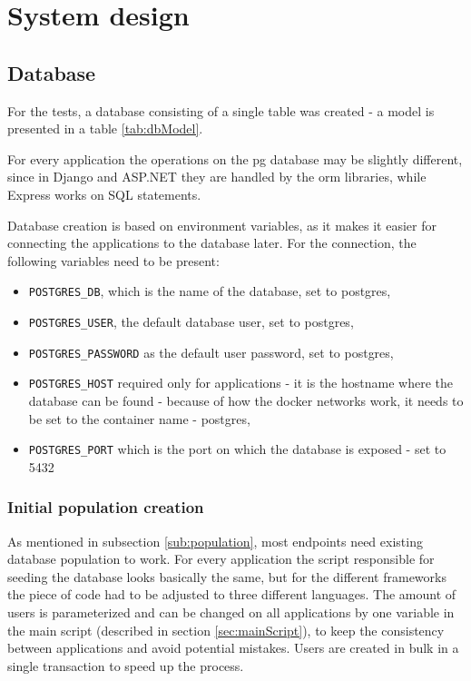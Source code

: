 
\chapter{System design}\label{cha:systemDesign}

\section{Database}\label{sec:pgDbVars}

For the tests, a database consisting of a single table was created - a model is presented in a table \ref{tab:dbModel}.



For every application the operations on the \acrlong{pg} database may be slightly different, since in Django and ASP.NET they are handled by the \acrlong{orm} libraries, while Express works on SQL statements.

Database creation is based on environment variables, as it makes it easier for connecting the applications to the database later. For the connection, the following variables need to be present:
\begin{itemize}
    \item \lstinline{POSTGRES_DB}, which is the name of the database, set to postgres,
    \item \lstinline{POSTGRES_USER}, the default database user, set to postgres,
    \item \lstinline{POSTGRES_PASSWORD} as the default user password, set to postgres,
    \item \lstinline{POSTGRES_HOST} required only for applications - it is the hostname where the database can be found - because of how the docker networks work, it needs to be set to the container name - postgres,
    \item \lstinline{POSTGRES_PORT} which is the port on which the database is exposed - set to 5432
\end{itemize}

\subsection{Initial population creation}

As mentioned in subsection \ref{sub:population}, most endpoints need existing database population to work. For every application the script responsible for seeding the database looks basically the same, but for the different frameworks the piece of code had to be adjusted to three different languages. The amount of users is parameterized and can be changed on all applications by one variable in the main script (described in section \ref{sec:mainScript}), to keep the consistency between applications and avoid potential mistakes. Users are created in bulk in a single transaction to speed up the process.

